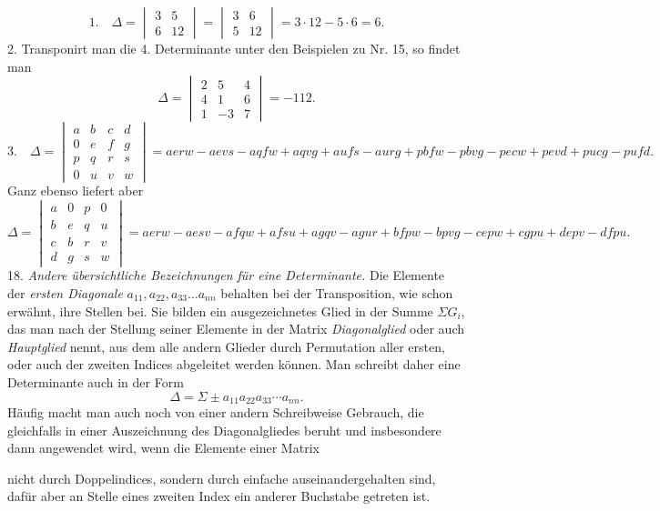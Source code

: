 \documentclass[11pt]{article}
\providecommand{\weberpage}[1]{}
\let\Delta\varDelta
\let\Sigma\varSigma
\begin{document}
\[
1.\quad \Delta = \begin{vmatrix}3 & 5\\6 & 12\end{vmatrix} = \begin{vmatrix}3 & 6\\5 & 12\end{vmatrix} = 3\cdot 12 - 5\cdot 6 = 6.
\]
2. Transponirt man die 4. Determinante unter den Beispielen zu Nr. 15, so findet man
\[
\Delta = \begin{vmatrix} 2 & 5 & 4\\ 4 & 1 & 6\\ 1 & -3 & 7 \end{vmatrix} = -112.
\]
\[
3.\quad \Delta = \begin{vmatrix} a & b & c & d\\ 0 & e & f & g\\ p & q & r & s\\ 0 & u & v & w \end{vmatrix} = aerw - aevs - aqfw + aqvg + aufs - aurg + pbfw - pbvg - pecw + pevd + pucg - pufd.
\]
Ganz ebenso liefert aber
\[
\Delta = \begin{vmatrix} a & 0 & p & 0\\ b & e & q & u\\ c & b & r & v\\ d & g & s & w \end{vmatrix} = aerw - aesv - afqw + afsu + agqv - agur + bfpw - bpvg - cepw + cgpu + depv - dfpu.
\]
18. \textit{Andere übersichtliche Bezeichnungen für eine Determinante.} Die Elemente der \textit{ersten Diagonale} $a_{11}, a_{22}, a_{33}\ldots a_{nn}$ behalten bei der Transposition, wie schon erwähnt, ihre Stellen bei. Sie bilden ein ausgezeichnetes Glied in der Summe $\Sigma G_i$, das man nach der Stellung seiner Elemente in der Matrix \textit{Diagonalglied} oder auch \textit{Hauptglied} nennt, aus dem alle andern Glieder durch Permutation aller ersten, oder auch der zweiten Indices abgeleitet werden können. Man schreibt daher eine Determinante auch in der Form
\[
\Delta = \Sigma \pm a_{11}a_{22}a_{33}\cdots a_{nn}.
\]
Häufig macht man auch noch von einer andern Schreibweise Gebrauch, die gleichfalls in einer Auszeichnung des Diagonalgliedes beruht und insbesondere dann angewendet wird, wenn die Elemente einer Matrix


\weberpage{24}
nicht durch Doppelindices, sondern durch einfache auseinandergehalten sind, dafür aber an Stelle eines zweiten Index ein anderer Buchstabe getreten ist.
\end{document}
